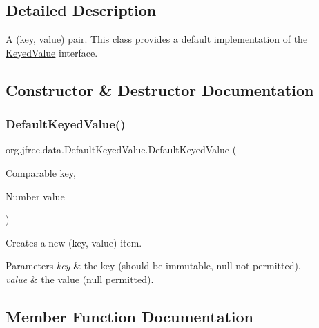 \subsection{Detailed Description}
A (key, value) pair. This class provides a default implementation of the \mbox{\hyperlink{interfaceorg_1_1jfree_1_1data_1_1_keyed_value}{Keyed\+Value}} interface. 

\subsection{Constructor \& Destructor Documentation}
\mbox{\label{classorg_1_1jfree_1_1data_1_1_default_keyed_value_a4d1c15cdefc96a23989aafceb6be411e}} 
\subsubsection{\texorpdfstring{Default\+Keyed\+Value()}{DefaultKeyedValue()}}
{\footnotesize\ttfamily org.\+jfree.\+data.\+Default\+Keyed\+Value.\+Default\+Keyed\+Value (\begin{DoxyParamCaption}\item[{Comparable}]{key,  }\item[{Number}]{value }\end{DoxyParamCaption})}

Creates a new (key, value) item.


\begin{DoxyParams}{Parameters}
{\em key} & the key (should be immutable, {\ttfamily null} not permitted). \\
\hline
{\em value} & the value ({\ttfamily null} permitted). \\
\hline
\end{DoxyParams}


\subsection{Member Function Documentation}
\mbox{\label{classorg_1_1jfree_1_1data_1_1_default_keyed_value_a8eeabccd61ddd6609615e31d50422b64}} 
